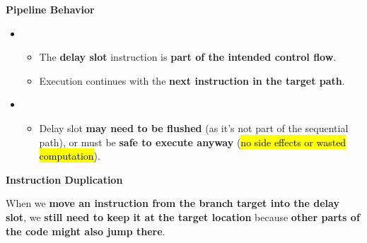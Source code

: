 \highspace
\begin{flushleft}
    \textcolor{Green3}{ \textbf{Pipeline Behavior}}
\end{flushleft}
\begin{itemize}
    \item {}
    \begin{itemize}
        \item The \textbf{delay slot} instruction is \textbf{part of the intended control flow}.
        \item Execution continues with the \textbf{next instruction in the target path}.
    \end{itemize}
    
    \item {}
    \begin{itemize}
        \item Delay slot \textbf{may need to be flushed} (as it's not part of the sequential path), or must be \textbf{safe to execute anyway} (\hl{no side effects or wasted computation}).
    \end{itemize}
\end{itemize}

\newpage

\begin{flushleft}
    \textcolor{Red2}{ \textbf{Instruction Duplication}}
\end{flushleft}
When we \textbf{move an instruction from the branch target into the delay slot}, we \textbf{still need to keep it at the target location} because \textbf{other parts of the code might also jump there}.

